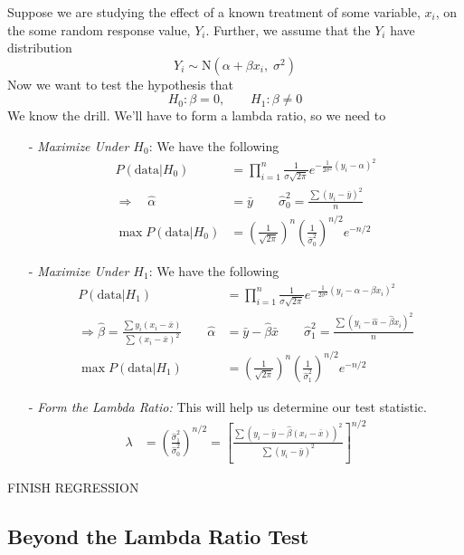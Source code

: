 \documentclass[a4paper,12pt]{scrartcl}
\begin{document}
Suppose we are studying the effect of a known treatment of some
variable, $x_i$, on the some random response value, $Y_i$.
Further, we assume that the $Y_i$ have distribution
   \[ Y_i \sim \text{N}(\alpha + \beta x_i,\; \sigma^2) \]
Now we want to test the hypothesis that
   \[ H_0: \beta = 0, \qquad H_1: \beta \neq 0 \]
We know the drill. We'll have to form a lambda ratio, so we need to
\begin{itemize}
   \item[-] {\sl Maximize Under $H_0$}: We have the following
      \begin{align*}
	 P(\text{data} | H_0) &= \prod^n_{i=1} \frac{1}{
	    \sigma\sqrt{2\pi}} e^{-\frac{1}{2\sigma^2}
	    (y_i - \alpha)^2} \\
	    \Rightarrow \quad \hat{\alpha} &= \bar{y} \qquad
	    \hat{\sigma}^2_0 = \frac{\sum (y_i - \bar{y})^2}{n}\\
	 \max P(\text{data} | H_0) &= \left(\frac{1}{\sqrt{2\pi}}
	    \right)^n \left(\frac{1}{\hat{\sigma}_0^2}\right)^{n/2}
	    e^{-n/2}
      \end{align*}
   \item[-] {\sl Maximize Under $H_1$}: We have the following
      \begin{align*}
	 P(\text{data} | H_1) &= \prod^n_{i=1} \frac{1}{
	    \sigma\sqrt{2\pi}} e^{-\frac{1}{2\sigma^2}
	    (y_i - \alpha - \beta x_i)^2} \\
	 \Rightarrow \hat{\beta} = \frac{\sum y_i(x_i - \bar{x})}{
	    \sum (x_i - \bar{x})^2} \qquad \hat{\alpha} &= \bar{y}-
	    \hat{\beta} \bar{x} \qquad \hat{\sigma}^2_1 =
	    \frac{\sum(y_i - \hat{\alpha} - \hat{\beta}x_i)^2}{n}\\
	 \max P(\text{data} | H_1) &= \left(\frac{1}{\sqrt{2\pi}}
	    \right)^n \left(\frac{1}{\hat{\sigma}_1^2}\right)^{n/2}
	    e^{-n/2}
      \end{align*}
   \item[-] {\sl Form the Lambda Ratio:} This will help us determine
      our test statistic.
      \begin{align*}
	 \lambda &= \left(\frac{\hat{\sigma}^2_1}{\hat{\sigma}^2_0}
	    \right)^{n/2} = \left[ \frac{
	       \sum(y_i - \bar{y} - \hat{\beta}(x_i-\bar{x}))^2}{
	       \sum (y_i - \bar{y})^2}\right]^{n/2}
      \end{align*}
\end{itemize}
FINISH REGRESSION



\newpage
\subsection{Beyond the Lambda Ratio Test}
\end{document}
